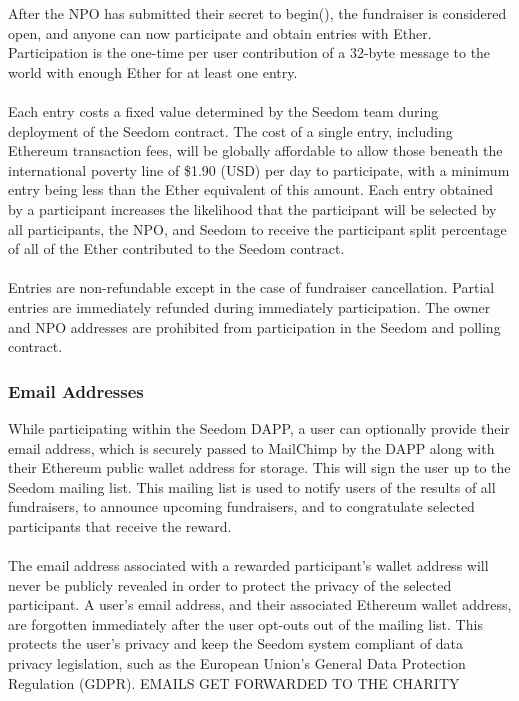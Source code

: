 \documentclass[11pt]{article}
\begin{document}
After the NPO has submitted their secret to begin(), the fundraiser is considered open, and anyone can now participate and obtain entries with Ether. Participation is the one-time per user contribution of a 32-byte message to the world with enough Ether for at least one entry.\\\\
Each entry costs a fixed value determined by the Seedom team during deployment of the Seedom contract. The cost of a single entry, including Ethereum transaction fees, will be globally affordable to allow those beneath the international poverty line of \$1.90 (USD) per day \cite{1} to participate, with a minimum entry being less than the Ether equivalent of this amount. Each entry obtained by a participant increases the likelihood that the participant will be selected by all participants, the NPO, and Seedom to receive the participant split percentage of all of the Ether contributed to the Seedom contract.\\\\
Entries are non-refundable except in the case of fundraiser cancellation. Partial entries are immediately refunded during immediately participation. The owner and NPO addresses are prohibited from participation in the Seedom and polling contract.

\subsubsection{Email Addresses}

While participating within the Seedom DAPP, a user can optionally provide their email address, which is securely passed to MailChimp by the DAPP along with their Ethereum public wallet address for storage. This will sign the user up to the Seedom mailing list. This mailing list is used to notify users of the results of all fundraisers, to announce upcoming fundraisers, and to congratulate selected participants that receive the reward.\\\\
The email address associated with a rewarded participant's wallet address will never be publicly revealed in order to protect the privacy of the selected participant. A user's email address, and their associated Ethereum wallet address, are forgotten immediately after the user opt-outs out of the mailing list. This protects the user's privacy and keep the Seedom system compliant of data privacy legislation, such as the European Union's General Data Protection Regulation (GDPR). EMAILS GET FORWARDED TO THE CHARITY
\end{document}
